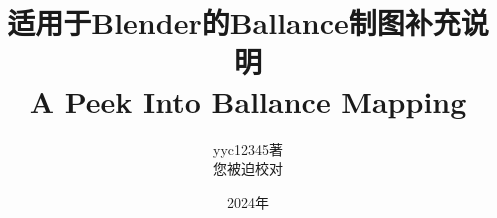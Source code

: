 \documentclass[10pt, a4paper, oneside]{ctexart}
\begin{document}
\title{适用于Blender的Ballance制图补充说明\\A Peek Into Ballance Mapping}
\author{yyc12345著\\您被迫校对}
\date{2024年}
\maketitle
\newpage
 

\newpage

\tableofcontents
\newpage



\newpage
\end{document}
